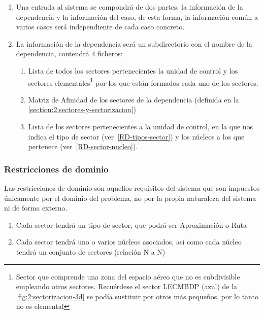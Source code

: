 \begin{enumerate}[label={\textbf{RIO\arabic*}}]
	\item  Una entrada al sistema se compondrá de dos partes: la información de la dependencia y la información del caso,
	de esta forma, la información común a varios casos será independiente de cada caso concreto.
	\item La información de la dependencia será un subdirectorio con el nombre de la dependencia, contendrá 4 ficheros:
	\begin{enumerate}[label*={\textbf{.\arabic*}}]
		\item  Lista de todos los sectores pertenecientes la unidad de control y los sectores elementales\footnote{
			Sector que comprende una zona del espacio aéreo que no es subdivisible empleando otros sectores. Recuérdese el sector LECMBDP (azul) de la \autoref{fig:2:sectorizacion-3d} se podía sustituir por otros más pequeños, por lo tanto no es elemental
		} por los que están formados cada uno de los sectores.
		
		\item  Matriz de Afinidad de los sectores de la dependencia (definida en la \autoref{section:2:sectores-y-sectorizacion})
		\item Lista de los sectores pertenecientes a la unidad de control, en la que nos indica el tipo de sector (ver~\ref{RD-tipos-sector}) y los núcleos a los que pertenece (ver~\ref{RD-sector-nucleo}).
	\end{enumerate}
	
\end{enumerate}


\subsubsection{Restricciones de dominio}
Las restricciones de dominio son aquellos requisitos del sistema que son impuestos únicamente por el dominio del problema, no por la propia naturaleza del sistema ni de forma externa.

\begin{enumerate}[label={\textbf{RD\arabic*}}]
	\item \label{RD-tipos-sector}  Cada sector tendrá un tipo de sector, que podrá ser Aproximación o Ruta
	\item  \label{RD-sector-nucleo} Cada sector tendrá uno o varios núcleos asociados, así como cada núcleo tendrá un conjunto de sectores (relación N a N)
	
\end{enumerate}